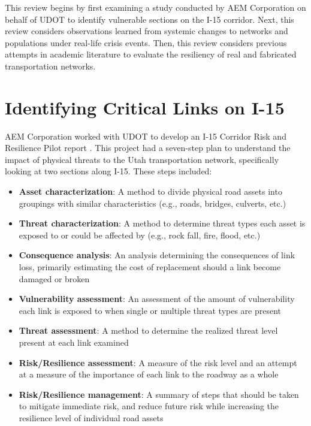 This review begins by first examining a study conducted by AEM Corporation on
behalf of UDOT to identify
vulnerable sections on the I-15 corridor. Next, this review considers observations
learned from systemic
changes to networks and populations under real-life crisis events. Then, this review
considers previous
attempts in academic literature to evaluate the resiliency of real and fabricated
transportation networks.

\section{Identifying Critical Links on I-15}

AEM Corporation worked with UDOT to develop an I-15 Corridor Risk and Resilience
Pilot report \citep{aem2017}. This
project had a seven-step plan to understand the impact of physical threats
to the Utah
transportation network, specifically looking at two sections along I-15.
These steps included:

\begin{itemize}
	\item \textbf{Asset characterization}: A method to divide physical road assets into
	groupings with similar characteristics (e.g., roads, bridges, culverts, etc.)
	\item \textbf{Threat characterization}: A method to determine threat types each asset
	is exposed to or could be affected by (e.g., rock fall, fire, flood, etc.)
	\item \textbf{Consequence analysis}: An analysis determining the consequences of link
	loss, primarily estimating the cost of replacement should a link become
	damaged or broken
	\item \textbf{Vulnerability assessment}: An assessment of the amount of vulnerability
	each link is exposed to when single or multiple threat types are present
	\item \textbf{Threat assessment}: A method to determine the realized threat level
	present at each link examined
	\item \textbf{Risk/Resilience assessment}: A measure of the risk level and an attempt
	at a measure of the importance of each link to the roadway as a whole
	\item \textbf{Risk/Resilience management}: A summary of steps that should be taken to
	mitigate immediate risk, and reduce future risk while increasing the
	resilience level of individual road assets
\end{itemize}

